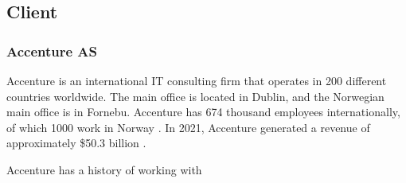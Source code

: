 \subsection{Client}
\subsubsection*{Accenture AS}

Accenture is an international IT consulting firm that operates in 200 different countries worldwide. The main office is located in Dublin, and the Norwegian main office is in Fornebu. Accenture has 674 thousand employees internationally, of which 1000 work in Norway \parencite{accenture_earning_report_2021}. In 2021, Accenture generated a revenue of approximately \$50.3 billion \parencite{accenture_about}.

Accenture has a history of working with 
